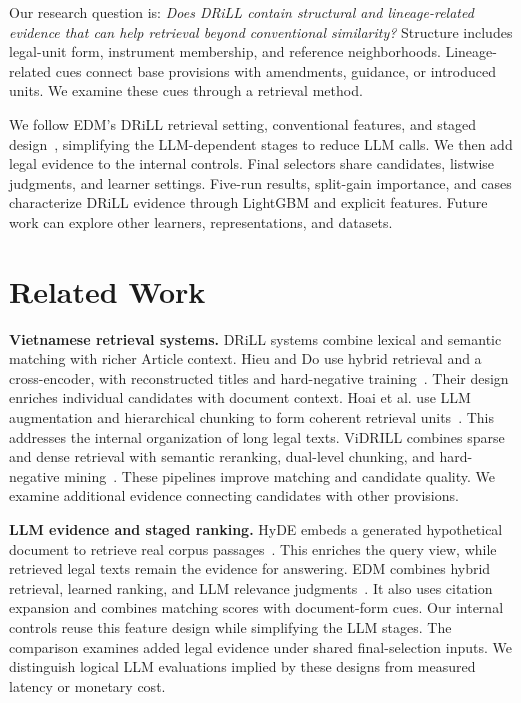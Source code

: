 \documentclass[runningheads,a4paper]{llncs}
\begin{document}
Our research question is: \emph{Does DRiLL contain structural and lineage-related evidence that can help retrieval beyond conventional similarity?} Structure includes legal-unit form, instrument membership, and reference neighborhoods. Lineage-related cues connect base provisions with amendments, guidance, or introduced units. We examine these cues through a retrieval method.

We follow EDM's DRiLL retrieval setting, conventional features, and staged design~\cite{pham2025edm}, simplifying the LLM-dependent stages to reduce LLM calls. We then add legal evidence to the internal controls. Final selectors share candidates, listwise judgments, and learner settings. Five-run results, split-gain importance, and cases characterize DRiLL evidence through LightGBM and explicit features. Future work can explore other learners, representations, and datasets.

\section{Related Work}
\noindent\textbf{Vietnamese retrieval systems.}
DRiLL systems combine lexical and semantic matching with richer Article context. Hieu and Do use hybrid retrieval and a cross-encoder, with reconstructed titles and hard-negative training~\cite{hieu2025twostage}. Their design enriches individual candidates with document context. Hoai et al. use LLM augmentation and hierarchical chunking to form coherent retrieval units~\cite{hoai2025chunking}. This addresses the internal organization of long legal texts. ViDRILL combines sparse and dense retrieval with semantic reranking, dual-level chunking, and hard-negative mining~\cite{tran2025vidrill}. These pipelines improve matching and candidate quality. We examine additional evidence connecting candidates with other provisions.

\noindent\textbf{LLM evidence and staged ranking.}
HyDE embeds a generated hypothetical document to retrieve real corpus passages~\cite{gao2023hyde}. This enriches the query view, while retrieved legal texts remain the evidence for answering. EDM combines hybrid retrieval, learned ranking, and LLM relevance judgments~\cite{pham2025edm}. It also uses citation expansion and combines matching scores with document-form cues. Our internal controls reuse this feature design while simplifying the LLM stages. The comparison examines added legal evidence under shared final-selection inputs. We distinguish logical LLM evaluations implied by these designs from measured latency or monetary cost.
\end{document}
